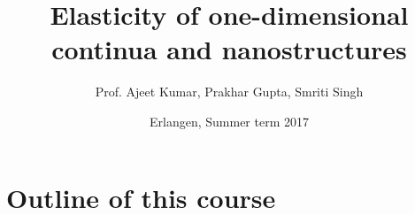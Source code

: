 \documentclass[t]{beamer}
\title[]{Elasticity of one-dimensional continua and nanostructures}
\author{Prof. Ajeet Kumar, Prakhar Gupta, Smriti Singh}
\date{Erlangen, Summer term 2017}
\institute{Chair of Applied Mechanics}
\begin{document}
\frame[plain,c]{\titlepage}







\section*{Outline of this course}

\frame{
  \tableofcontents
}









%



\end{document}
